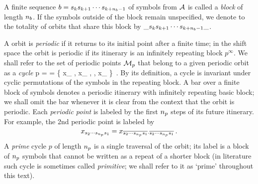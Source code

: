A finite sequence $b={ {s_{k}} {s_{k+1}} \cdots {\ensuremath{s_{k+{n_{b}}-1}}}}$
of symbols from ${\cal A}$ is called a {\em block}
of length ${n_{b}}$. If the symbols outside of the block remain
unspecified, we denote to the totality of orbits that
share this block by
$\_{{s_{k}} {s_{k+1}} \cdots {\ensuremath{s_{k+{n_{b}}-1}}}}\_$.

A {\statesp} orbit is {\em periodic} if it returns to
its initial point after a finite time;
in the shift space the orbit is periodic if
its itinerary is an infinitely repeating block
$p^\infty$.
We shall refer to the set of periodic points ${\cal M}_p$ that
belong to a given periodic orbit
as a {\em cycle}
\beq
p =  
  = \{
      x_{  \cdots {}},
      x_{  \cdots {} },
    \cdots,
      x_{  \cdots {}}
     \}
\,.
By its definition, a cycle is invariant under cyclic permutations
of the symbols in the repeating block.
A bar over a finite block of symbols denotes a periodic
itinerary with infinitely  repeating basic block;
we shall omit the bar whenever
it is clear from the context that the orbit is periodic.
Each {\em periodic point} is labeled by the first $\cl{p}$
steps of its future
itinerary. For example, the 2nd periodic point is labeled by
\[
      x_{ \Ssym{2} \cdots \Ssym{\cl{p}} \Ssym{1}}
    =
x_{ \cycle{ \Ssym{2} \cdots \Ssym{\cl{p}} \Ssym{1} }
    \cdot
    \cycle{ \Ssym{2} \cdots \Ssym{\cl{p}} \Ssym{1}} }
\,.
\]
A {\em prime} cycle
$p$ of length ${{n_{p}}}$ is a single traversal of the orbit;
its label is a block of ${n_{p}}$ symbols that cannot be written as
a repeat of a shorter block (in literature such cycle is sometimes
called {\em primitive};
we shall refer to it
as `prime' throughout this text).

